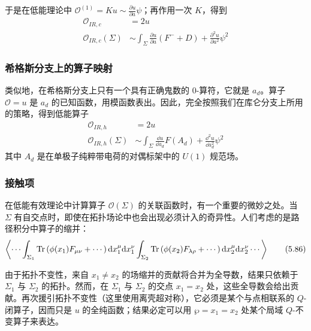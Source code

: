 于是在低能理论中 $\mathcal{O}^{(1)}=Ku\sim\frac{\partial u}{\partial a}\psi$；再作用一次 $K$，得到
\begin{equation}
\begin{aligned}
\mathcal{O}_{IR,c}&=2u\\
\mathcal{O}_{IR,c}(\Sigma)&\sim\int_{\Sigma}\frac{\partial u}{\partial a}\left(F^{-}+D\right)
+\frac{\partial^{2}u}{\partial a^{2}}\psi^{2}
\end{aligned}
\tag{5.84}
\end{equation}

\subsubsection{希格斯分支上的算子映射}

类似地，在希格斯分支上只有一个具有正确鬼数的 0-算符，它就是 $a_{d}$。算子 $\mathcal{O}=u$ 是 $a_{d}$ 的已知函数，用模函数表出。因此，完全按照我们在库仑分支上所用的策略，得到低能算子
\begin{equation}
\begin{aligned}
\mathcal{O}_{IR,h}&=2u\\
\mathcal{O}_{IR,h}(\Sigma)&\sim\int_{\Sigma}\frac{\dd u}{\dd a_{d}}F(A_{d})
+\frac{\dd^{2}u}{\dd a_{d}^{2}}\psi^{2}
\end{aligned}
\tag{5.85}
\end{equation}
其中 $A_{d}$ 是在单极子纯粹带电荷的对偶标架中的 $U(1)$ 规范场。

\subsubsection{接触项}

在低能有效理论中计算算子 $\mathcal{O}(\Sigma)$ 的关联函数时，有一个重要的微妙之处。当 $\Sigma$ 有自交点时，即使在拓扑场论中也会出现必须计入的奇异性。人们考虑的是路径积分中算子的缩并：
\begin{equation}
\left\langle\cdots\int_{\Sigma_{1}}\operatorname{Tr}\left(\phi(x_{1})F_{\mu\nu}+\cdots\right)\mathrm{d} x_{1}^{\mu}\mathrm{d} x_{1}^{\nu}
\int_{\Sigma_{2}}\operatorname{Tr}\left(\phi(x_{2})F_{\lambda\rho}+\cdots\right)\mathrm{d} x_{2}^{\mu}\mathrm{d} x_{2}^{\nu}\cdots\right\rangle
\tag{5.86}
\end{equation}

由于拓扑不变性，来自 $x_{1}\neq x_{2}$ 的场缩并的贡献将合并为全导数，结果只依赖于 $\Sigma_{1}$ 与 $\Sigma_{2}$ 的拓扑。然而，在 $\Sigma_{1}$ 与 $\Sigma_{2}$ 的交点 $x_{1}=x_{2}$ 处，这些全导数会给出贡献。再次援引拓扑不变性（这里使用离壳超对称），它必须是某个与点相联系的 $Q$-闭算子，因而只是 $u$ 的全纯函数；结果必定可以用 $\wp=x_{1}=x_{2}$ 处某个局域 $Q$-不变算子来表达。

